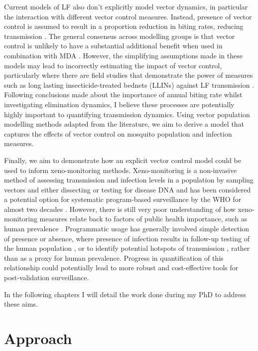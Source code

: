 Current models of LF also don't explicitly model vector dynamics, in particular the interaction with different vector control measures. Instead, presence of vector control is assumed to result in a proportion reduction in biting rates, reducing transmission \cite{irvine2015}. The general consensus across modelling groups is that vector control is unlikely to have a substantial additional benefit when used in combination with MDA \cite{Irvine2017_Tripledrug}. However, the simplifying assumptions made in these models may lead to incorrectly estimating the impact of vector control, particularly where there are field studies that demonstrate the power of measures such as long lasting insecticide-treated bednets (LLINs) against LF transmission \cite{rebollo2015,Odermatt2008,Njenga2011,Blackburn2006}. Following conclusions made about the importance of annual biting rate whilst investigating elimination dynamics, I believe these processes are potentially highly important to quantifying transmission dynamics. Using vector population modelling methods adapted from the literature, we aim to derive a model that captures the effects of vector control on mosquito population and infection measures.

Finally, we aim to demonstrate how an explicit vector control model could be used to inform xeno-monitoring methods. Xeno-monitoring is a non-invasive method of assessing transmission and infection levels in a population by sampling vectors and either dissecting or testing for disease DNA and has been considered a potential option for systematic program-based surveillance by the WHO for almost two decades \cite{WHO2002xeno}. However, there is still very poor understanding of how xeno-monitoring measures relate back to factors of public health importance, such as human prevalence \cite{Schmaedick2014}. Programmatic usage has generally involved simple detection of presence or absence, where presence of infection results in follow-up testing of the human population \cite{Chadee2002,Rao2016}, or to identify potential hotspots of transmission \cite{Swaminathan2017}, rather than as a proxy for human prevalence. Progress in quantification of this relationship could potentially lead to more robust and cost-effective tools for post-validation surveillance.

In the following chapters I will detail the work done during my PhD to address these aims. 

\section{Approach}

